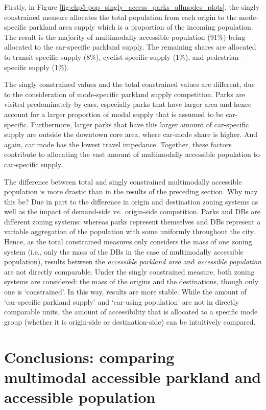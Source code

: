 \documentclass[
11pt, %
oneside, %
english, %
singlespacing, %
]{macthesis} %
\begin{document}
Firstly, in Figure \ref{fig:chp5-pop_singly_access_parks_allmodes_plots}, the singly constrained measure allocates the total population from each origin to the mode-specific parkland area supply which is a proportion of the incoming population. The result is the majority of multimodally accessible population (91\%) being allocated to the car-specific parkland supply. The remaining shares are allocated to transit-specific supply (8\%), cyclist-specific supply (1\%), and pedestrian-specific supply (1\%).

The singly constrained values and the total constrained values are different, due to the consideration of mode-specific parkland supply competition. Parks are visited predominately by cars, especially parks that have larger area and hence account for a larger proportion of modal supply that is assumed to be car-specific. Furthermore, larger parks that have this larger amount of car-specific supply are outside the downtown core area, where car-mode share is higher. And again, car mode has the lowest travel impedance. Together, these factors contribute to allocating the vast amount of multimodally accessible population to car-specific supply.

The difference between total and singly constrained multimodally accessible population is more drastic than in the results of the preceding section. Why may this be? Due in part to the difference in origin and destination zoning systems as well as the impact of demand-side vs.~origin-side competition. Parks and DBs are different zoning systems: whereas parks represent themselves and DBs represent a variable aggregation of the population with some uniformly throughout the city. Hence, as the total constrained measures only considers the mass of one zoning system (i.e., only the mass of the DBs in the case of multimodally accessible population), results between the \emph{accessible parkland area} and \emph{accessible population} are not directly comparable. Under the singly constrained measure, both zoning systems are considered: the mass of the origins and the destinations, though only one is `constrained'. In this way, results are more stable. While the amount of `car-specific parkland supply' and `car-using population' are not in directly comparable units, the amount of accessibility that is allocated to a specific mode group (whether it is origin-side or destination-side) can be intuitively compared.

\section{Conclusions: comparing multimodal accessible parkland and accessible population}\label{conclusions-comparing-multimodal-accessible-parkland-and-accessible-population}
\end{document}
